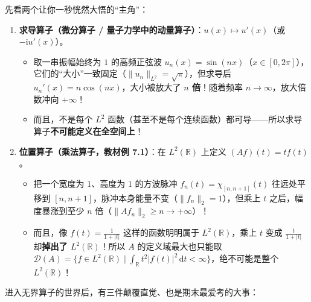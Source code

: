 \documentclass[11pt,a4paper]{article}
\providecommand{\tightlist}{\setlength{\itemsep}{2pt}\setlength{\parskip}{0pt}}
\begin{document}
先看两个让你一秒恍然大悟的``主角''：

\begin{enumerate}
\def\labelenumi{\arabic{enumi}.}
\tightlist
\item
  \textbf{求导算子（微分算子 / 量子力学中的动量算子）}：\(u(x) \mapsto u'(x)\)（或 \(-\mathrm{i} u'(x)\)）。

  \begin{itemize}
  \tightlist
  \item
    取一串振幅始终为 \(1\) 的高频正弦波 \(u_n(x) = \sin(nx)\)（\(x \in [0, 2\pi]\)），它们的``大小''一致固定（\(\|u_n\|_{L^2} = \sqrt{\pi}\)），但求导后 \(u_n'(x) = n\cos(nx)\)，大小被放大了 \textbf{\(n\) 倍}！随着频率 \(n \to \infty\)，放大倍数冲向 \(+\infty\)！
  \item
    而且，不是每个 \(L^2\) 函数（甚至不是每个连续函数）都可导——所以求导算子\textbf{不可能定义在全空间上}！
  \end{itemize}
\item
  \textbf{位置算子（乘法算子，教材例 7.1）}：在 \(L^2(\mathbb{R})\) 上定义 \((Af)(t) = t f(t)\)。

  \begin{itemize}
  \tightlist
  \item
    把一个宽度为 \(1\)、高度为 \(1\) 的方波脉冲 \(f_n(t) = \chi_{[n, n+1]}(t)\) 往远处平移到 \([n, n+1]\)，脉冲本身能量不变（\(\|f_n\|_2 = 1\)），但乘上 \(t\) 之后，幅度暴涨到至少 \(n\) 倍（\(\|Af_n\|_2 \ge n \to +\infty\)）！
  \item
    而且，像 \(f(t) = \frac{1}{1+|t|}\) 这样的函数明明属于 \(L^2(\mathbb{R})\)，乘上 \(t\) 变成 \(\frac{t}{1+|t|}\) 却\textbf{掉出了 \(L^2(\mathbb{R})\)}！所以 \(A\) 的定义域最大也只能取 \(\mathcal{D}(A) = \{f \in L^2(\mathbb{R}) \mid \int_{\mathbb{R}} t^2|f(t)|^2\,\mathrm{d}t < \infty\}\)，绝不可能是整个 \(L^2(\mathbb{R})\)！
  \end{itemize}
\end{enumerate}

进入无界算子的世界后，有三件颠覆直觉、也是期末最爱考的大事：
\end{document}
